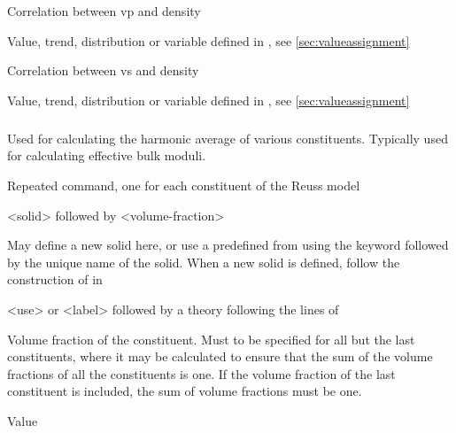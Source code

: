 {
 \slist
   \item \Description Correlation between vp and density
   \item \Argument Value, trend, distribution or variable defined in , see \autoref{sec:valueassignment}
   \item {}
 \elist

 \slist
   \item \Description Correlation between vs and density
   \item \Argument Value, trend, distribution or variable defined in , see \autoref{sec:valueassignment}
   \item {}
 \elist

\subparagraph{}
 \slist
   \item \Description Used for calculating the harmonic average of various constituents. Typically used for calculating effective bulk moduli.
   \item \Argument
   \item \Default
 \elist

 \slist
   \item \Description Repeated command, one for each constituent of the Reuss model
   \item \Argument <solid> followed by <volume-fraction>
   \item \Default
 \elist

 \slist
   \item \Description May define a new solid here, or use a predefined  from  using the keyword  followed by the unique name of the solid. When a new solid is defined, follow the construction of  in 
   \item \Argument <use> or <label> followed by a theory following the lines of 
   \item \Default
 \elist

 \slist
   \item \Description Volume fraction of the constituent. Must to be specified for all but the last constituents, where it may be calculated to ensure that the sum of the volume fractions of all the constituents is one. If the volume fraction of the last constituent is included, the sum of volume fractions must be one.
   \item \Argument Value
   \item \Default
 \elist

}
